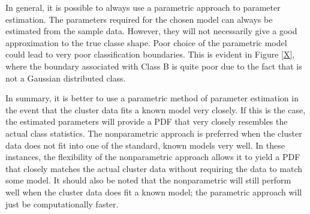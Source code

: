 In general, it is possible to always use a parametric approach to parameter estimation.  The parameters required for the chosen model can always be estimated from the sample data.  However, they will not necessarily give a good approximation to the true classe shape.  Poor choice of the parametric model could lead to very poor classification boundaries.  This is evident in Figure \ref{X}, where the boundary associated with Class B is quite poor due to the fact that is not a Gaussian distributed class.  

In summary, it is better to use a parametric method of parameter estimation in the event that the cluster data fits a known model very closely.  If this is the case, the estimated parameters will provide a PDF that very closely resembles the actual class statistics.  The nonparametric approach is preferred when the cluster data does not fit into one of the standard, known models very well.  In these instances, the flexibility of the nonparametric approach allows it to yield a PDF that closely matches the actual cluster data without requiring the data to match some model.  It should also be noted that the nonparametric will still perform well when the cluster data does fit a known model; the parametric approach will just be computationally faster.